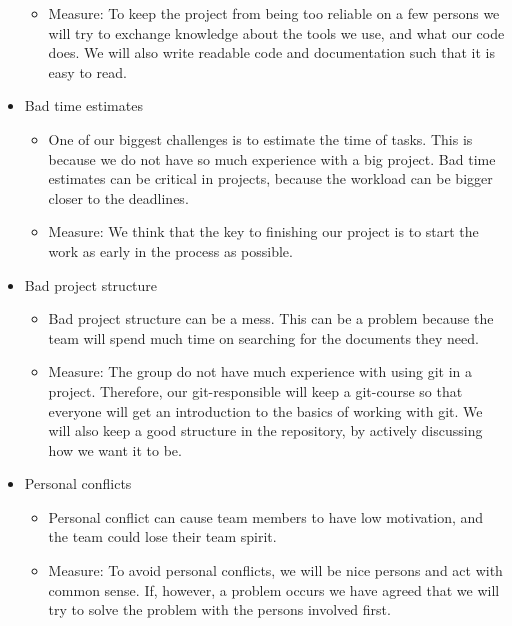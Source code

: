 \documentclass{article}
\begin{document}
\begin{itemize}
\begin{itemize}
    \end{itemize}
    \begin{itemize}
    \item Measure:
    To keep the project from being too reliable on a few persons we will try to exchange knowledge about the tools we use, and what our code does. We will also write readable code and documentation such that it is easy to read. 
    \end{itemize}
\item Bad time estimates
    \begin{itemize}
    \item One of our biggest challenges is to estimate the time of tasks. This is because we do not have so much experience with a big project. Bad time estimates can be critical in projects, because the workload can be bigger closer to the deadlines.
    \end{itemize}
    \begin{itemize}
    \item Measure:
    We think that the key to finishing our project is to start the work as early in the process as possible.
    \end{itemize}
\item Bad project structure
    \begin{itemize}
    \item Bad project structure can be a mess. This can be a problem because the team will spend much time on searching for the documents they need.
    \end{itemize}
    \begin{itemize}
    \item Measure:
    The group do not have much experience with using git in a project. Therefore, our git-responsible will keep a git-course so that everyone will get an introduction to the basics of working with git. We will also keep a good structure in the repository, by actively discussing how we want it to be. 
    \end{itemize}
\item Personal conflicts
    \begin{itemize}
    \item Personal conflict can cause team members to have low motivation, and the team could lose their team spirit.
    \end{itemize}
    \begin{itemize}
    \item Measure:
    To avoid personal conflicts, we will be nice persons and act with common sense. If, however, a problem occurs we have agreed that we will try to solve the problem with the persons involved first.
    \end{itemize}
\end{itemize}
\end{document}
